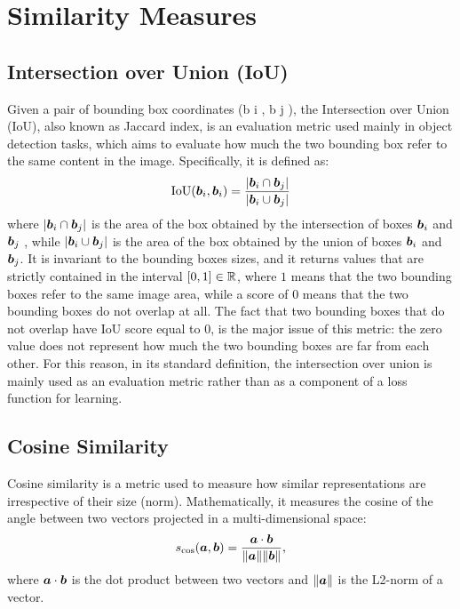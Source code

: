 
\section{Similarity Measures}

\subsection{Intersection over Union (IoU)}

Given a pair of bounding box coordinates (b i , b j ), the
Intersection over Union (IoU), also known as Jaccard index, is an evaluation metric used mainly in object detection
tasks, which aims to evaluate how much the two bounding
box refer to the same content in the image. Specifically, it
is defined as:
\[
  \text{IoU}(\bm{b}_i, \bm{b}_i) = \frac{| \bm{b}_i \cap \bm{b}_j |}{| \bm{b}_i \cup \bm{b}_j |}
\]
where $| \bm{b}_i \cap \bm{b}_j |$ is the area of the box obtained by
the intersection of boxes $\bm{b}_i$ and $\bm{b}_j$ , while $| \bm{b}_i
\cup \bm{b}_j |$ is the area of the box obtained by the union of
boxes $\bm{b}_i$ and $\bm{b}_j$. It is invariant to the bounding boxes
sizes, and it returns values that are strictly contained in the
interval $[0, 1] \in \mathbb{R}$, where $1$ means that the two bounding
boxes refer to the same image area, while a score of $0$ means that
the two bounding boxes do not overlap at all. The fact that two
bounding boxes that do not overlap have IoU score equal to $0$, is the
major issue of this metric: the zero value does not represent how much
the two bounding boxes are far from each other. For this reason, in
its standard definition, the intersection over union is mainly used as
an evaluation metric rather than as a component of a loss function for
learning.

\subsection{Cosine Similarity}

Cosine similarity is a metric used to measure how similar
representations are irrespective of their size (norm). Mathematically,
it measures the cosine of the angle between two vectors projected in a
multi-dimensional space:
\begin{equation}
  s_{\cos}(\bm{a}, \bm{b}) = \frac{\bm{a} \cdot \bm{b}}{\| \bm{a} \| \| \bm{b} \|},
\end{equation}
where $\bm{a} \cdot \bm{b}$ is the dot product between two vectors and
$\| \bm{a} \|$ is the L2-norm of a vector.
